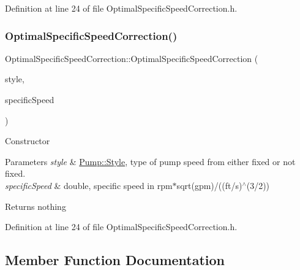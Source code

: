 Definition at line 24 of file Optimal\+Specific\+Speed\+Correction.\+h.

\mbox{\label{class_optimal_specific_speed_correction_a59cfd32e730fabce525602cbe0b646c4}} 
\subsubsection{\texorpdfstring{Optimal\+Specific\+Speed\+Correction()}{OptimalSpecificSpeedCorrection()}\hspace{0.1cm}{\footnotesize\ttfamily [3/3]}}
{\footnotesize\ttfamily Optimal\+Specific\+Speed\+Correction\+::\+Optimal\+Specific\+Speed\+Correction (\begin{DoxyParamCaption}\item[{\hyperlink{class_pump_aef354601ce4218258cc898b35a1e90ff}{Pump\+::\+Style}}]{style,  }\item[{double}]{specific\+Speed }\end{DoxyParamCaption})\hspace{0.3cm}{\ttfamily [inline]}}

Constructor 
\begin{DoxyParams}{Parameters}
{\em style} & \hyperlink{class_pump_aef354601ce4218258cc898b35a1e90ff}{Pump\+::\+Style}, type of pump speed from either fixed or not fixed. \\
\hline
{\em specific\+Speed} & double, specific speed in rpm$\ast$sqrt(gpm)/((ft/s)$^\wedge$(3/2)) \\
\hline
\end{DoxyParams}
\begin{DoxyReturn}{Returns}
nothing 
\end{DoxyReturn}


Definition at line 24 of file Optimal\+Specific\+Speed\+Correction.\+h.



\subsection{Member Function Documentation}
\mbox{\label{class_optimal_specific_speed_correction_a3337ebde4e64c20f19adbda6204fa0be}} 
